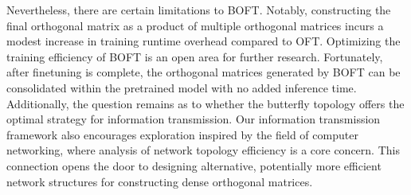 Nevertheless, there are certain limitations to BOFT. Notably, constructing the final orthogonal matrix as a product of multiple orthogonal matrices incurs a modest increase in training runtime overhead compared to OFT. Optimizing the training efficiency of BOFT is an open area for further research. Fortunately, after finetuning is complete, the orthogonal matrices generated by BOFT can be consolidated within the pretrained model with no added inference time. Additionally, the question remains as to whether the butterfly topology offers the optimal strategy for information transmission. Our information transmission framework also encourages exploration inspired by the field of computer networking, where analysis of network topology efficiency is a core concern. This connection opens the door to designing alternative, potentially more efficient network structures for constructing dense orthogonal matrices.

